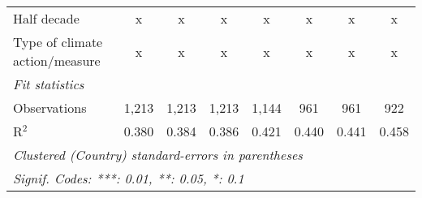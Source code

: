 \begin{tabular}{lccccccc}
   Half decade                                                                                       & x           & x           & x            & x              & x              & x              & x\\  
   Type of climate action/measure                                                                    & x           & x           & x            & x              & x              & x              & x\\  
   \midrule \emph{Fit statistics}\\
   Observations                                                                                      & 1,213       & 1,213       & 1,213        & 1,144          & 961            & 961            & 922\\  
   R$^2$                                                                                             & 0.380       & 0.384       & 0.386        & 0.421          & 0.440          & 0.441          & 0.458\\  
   \midrule
   \multicolumn{8}{l}{\emph{Clustered (Country) standard-errors in parentheses}}\\
   \multicolumn{8}{l}{\emph{Signif. Codes: ***: 0.01, **: 0.05, *: 0.1}}\\
\end{tabular}
\par\endgroup



